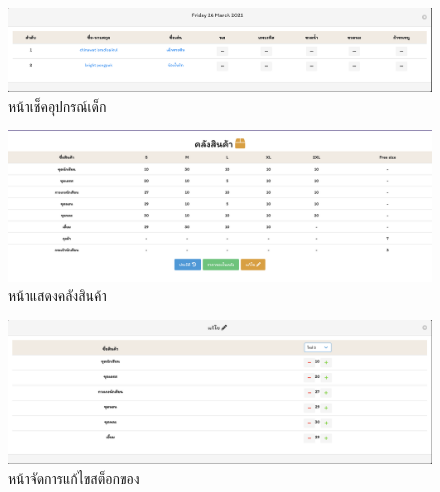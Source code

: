     \begin{figure}
      \begin{center}
      \includegraphics[width=\linewidth]{images/checkGadget.png}
      \end{center}
      \caption[หน้าเช็คอุปกรณ์เด็ก]{หน้าเช็คอุปกรณ์เด็ก}
      \label{fig:CheckGadget}
      \end{figure}
      \begin{figure}
        \begin{center}
        \includegraphics[width=\linewidth]{images/Stock.png}
        \end{center}
        \caption[หน้าแสดงคลังสินค้า]{หน้าแสดงคลังสินค้า}
        \label{fig:Stock}
        \end{figure}
    
    
      \begin{figure}
        \begin{center}
        \includegraphics[width=\linewidth]{images/handleStock.png}
        \end{center}
        \caption[หน้าจัดการแก้ไขสต็อกของ]{หน้าจัดการแก้ไขสต็อกของ}
        \label{fig:CheckStock}
        \end{figure}
    
    
    
